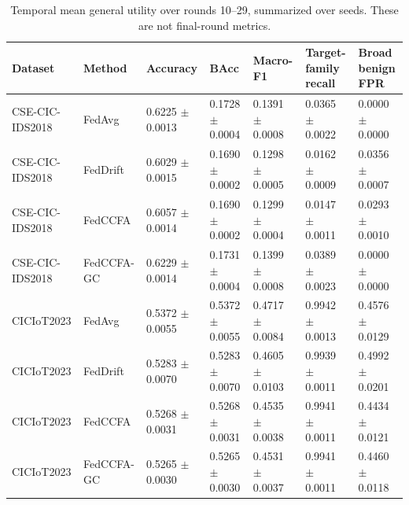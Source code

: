 \begin{table}[t]
\centering
\small
\setlength{\tabcolsep}{3pt}
\caption{Temporal mean general utility over rounds 10--29, summarized over seeds. These are not final-round metrics.}
\label{tab:post_drift_utility}
\begin{tabular}{lllllll}
\hline
Dataset & Method & Accuracy & BAcc & Macro-F1 & \shortstack{Target-family\\recall} & \shortstack{Broad benign\\FPR} \\
\hline
CSE-CIC-IDS2018 & FedAvg & 0.6225 $\pm$ 0.0013 & 0.1728 $\pm$ 0.0004 & 0.1391 $\pm$ 0.0008 & 0.0365 $\pm$ 0.0022 & 0.0000 $\pm$ 0.0000 \\
CSE-CIC-IDS2018 & FedDrift & 0.6029 $\pm$ 0.0015 & 0.1690 $\pm$ 0.0002 & 0.1298 $\pm$ 0.0005 & 0.0162 $\pm$ 0.0009 & 0.0356 $\pm$ 0.0007 \\
CSE-CIC-IDS2018 & FedCCFA & 0.6057 $\pm$ 0.0014 & 0.1690 $\pm$ 0.0002 & 0.1299 $\pm$ 0.0004 & 0.0147 $\pm$ 0.0011 & 0.0293 $\pm$ 0.0010 \\
CSE-CIC-IDS2018 & FedCCFA-GC & 0.6229 $\pm$ 0.0014 & 0.1731 $\pm$ 0.0004 & 0.1399 $\pm$ 0.0008 & 0.0389 $\pm$ 0.0023 & 0.0000 $\pm$ 0.0000 \\
CICIoT2023 & FedAvg & 0.5372 $\pm$ 0.0055 & 0.5372 $\pm$ 0.0055 & 0.4717 $\pm$ 0.0084 & 0.9942 $\pm$ 0.0013 & 0.4576 $\pm$ 0.0129 \\
CICIoT2023 & FedDrift & 0.5283 $\pm$ 0.0070 & 0.5283 $\pm$ 0.0070 & 0.4605 $\pm$ 0.0103 & 0.9939 $\pm$ 0.0011 & 0.4992 $\pm$ 0.0201 \\
CICIoT2023 & FedCCFA & 0.5268 $\pm$ 0.0031 & 0.5268 $\pm$ 0.0031 & 0.4535 $\pm$ 0.0038 & 0.9941 $\pm$ 0.0011 & 0.4434 $\pm$ 0.0121 \\
CICIoT2023 & FedCCFA-GC & 0.5265 $\pm$ 0.0030 & 0.5265 $\pm$ 0.0030 & 0.4531 $\pm$ 0.0037 & 0.9941 $\pm$ 0.0011 & 0.4460 $\pm$ 0.0118 \\
\hline
\end{tabular}
\end{table}
